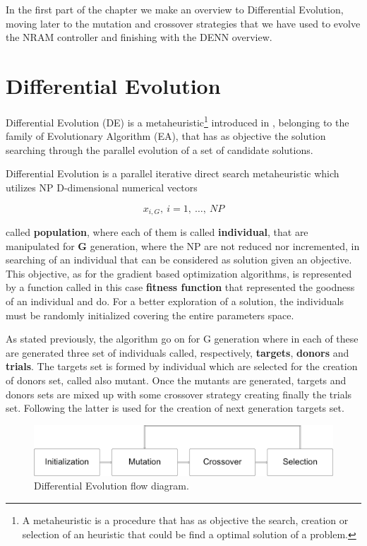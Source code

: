 \label{chap:differential-evolution}
In the first part of the chapter we make an overview to Differential Evolution, moving later to the mutation and crossover strategies that we have used to evolve the NRAM controller and finishing with the DENN overview.

\section{Differential Evolution}
Differential Evolution (DE) is a metaheuristic\footnote{A metaheuristic is a procedure that has as objective the search, creation or selection of an heuristic that could be find a optimal solution of a problem.} introduced in \cite{DESEHGOCS:1997}, belonging to the family of Evolutionary Algorithm (EA), that has as objective the solution searching through the parallel evolution of a set of candidate solutions. 

Differential Evolution is a parallel iterative direct search metaheuristic which utilizes NP D-dimensional numerical vectors 
\begin{center}
	\begin{equation}
		x_{i, G},\ i=1,\ \dots,\ NP 
	\end{equation}
\end{center}
called \textbf{population}, where each of them is called \textbf{individual}, that are manipulated for \textbf{G} generation, where the NP are not reduced nor incremented, in searching of an individual that can be considered as solution given an objective. This objective, as for the gradient based optimization algorithms, is represented by a function called in this case \textbf{fitness function} that represented the goodness of an individual and do. For a better exploration of a solution, the individuals must be randomly initialized covering the entire parameters space. 

As stated previously, the algorithm go on for G generation where in each of these are generated three set of individuals called, respectively, \textbf{targets}, \textbf{donors} and \textbf{trials}. The targets set is formed by individual which are selected for the creation of donors set, called also mutant. Once the mutants are generated, targets and donors sets are mixed up with some crossover strategy creating finally the trials set. Following the latter is used for the creation of next generation targets set. \\

\begin{figure}[t]
	\centering
	\includegraphics[width=\textwidth]{figures/de-flow.png}
	\caption{Differential Evolution flow diagram.}
\end{figure}

